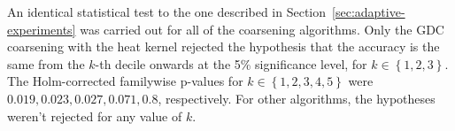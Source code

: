 An identical statistical test to the one described in Section~\ref{sec:adaptive-experiments} was carried out for all of the coarsening algorithms. Only the GDC coarsening with the heat kernel rejected the hypothesis that the accuracy is the same from the \( k \)-th decile onwards at the 5\% significance level, for \( k \in \left\{ 1, 2, 3 \right\} \). The Holm-corrected familywise p-values for \( k \in \left\{ 1, 2, 3, 4, 5 \right\} \) were \( 0.019, 0.023, 0.027, 0.071, 0.8 \), respectively. For other algorithms, the hypotheses weren't rejected for any value of \( k \).
